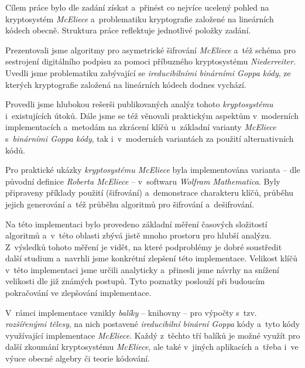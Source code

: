 \documentclass[thesis=M,czech,hidelinks]{FITthesis}[2012/06/26]
\newcommand{\0}{{\textcolor[gray]{0.75}{0}}}
\begin{document}
\begin{conclusion}

Cílem práce bylo dle zadání získat a~přinést co nejvíce ucelený pohled na
kryptosystém \emph{McEliece} a~problematiku kryptografie založené na lineárních
kódech obecně. Struktura práce reflektuje jednotlivé položky zadání.

\vspace{0.5cm}

Prezentovali jsme algoritmy pro asymetrické šifrování \emph{McEliece} a~též
schéma pro sestrojení digitálního podpisu za pomoci příbuzného kryptosystému
\emph{Niederreiter}. Uvedli jsme problematiku zabývající se
\emph{ireducibilními binárními Goppa kódy}, ze kterých kryptografie
založená na lineárních kódech dodnes vychází.

Provedli jsme hlubokou rešerši publikovaných analýz tohoto \emph{kryptosystému}
i~existujících útoků. Dále jsme se též věnovali praktickým aspektům v~moderních
implementacích a~metodám na zkrácení klíčů u~základní varianty \emph{McEliece}
s~\emph{binárními Goppa kódy}, tak i~v~moderních variantách za použití
alternativních kódů.

Pro praktické ukázky \emph{kryptosystému McEliece} byla implementována
varianta -- dle původní definice \emph{Roberta McEliece} -- v~softwaru
\emph{Wolfram Mathematica}. Byly připraveny příklady použití (šifrování)
a~demonstrace charakteru klíčů, průběhu jejich generování a~též průběhu
algoritmů pro šifrování a~dešifrování.

Na této implementaci bylo provedeno základní měření časových složitostí
algoritmů a~v~této oblasti zbývá jistě mnoho prostoru pro hlubší analýzu.
Z~výsledků tohoto měření je vidět, na které podproblémy je dobré soustředit
další studium a~navrhli jsme konkrétní zlepšení této implementace. Velikost
klíčů v~této implementaci jsme určili analyticky a~přinesli jsme návrhy na
snížení velikosti dle již známých postupů. Tyto poznatky poslouží při budoucím
pokračování ve zlepšování implementace.

V~rámci implementace vznikly \emph{balíky} -- knihovny -- pro výpočty s~tzv.
\emph{rozšířenými tělesy}, na nich postavené \emph{ireducibilní binární Goppa}
kódy a~tyto kódy využívající implementace \emph{McEliece}. Každý z~těchto tří
balíků je možné využít pro další zkoumání kryptosystému \emph{McEliece}, ale
také v~jiných aplikacích a~třeba i~ve výuce obecné algebry či teorie kódování.


\end{conclusion}
\end{document}
